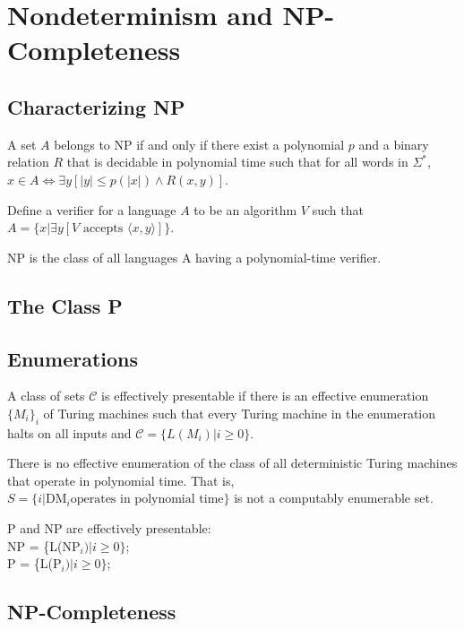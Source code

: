 \section{Nondeterminism and NP-Completeness}

\subsection{Characterizing NP}

 A set $A$ belongs to NP if and only if there exist a polynomial
$p$ and a binary relation $R$ that is decidable in polynomial time such that for all words
in $\Sigma^*$,
$x \in A \Leftrightarrow \exists y [|y| \le p(|x|) \land R(x, y)]$.

 Define a verifier for a language $A$ to be an algorithm $V$ such that
$A = \{x |\exists y[V \text{ accepts } \langle x, y \rangle ]\}$.

 NP is the class of all languages A having a polynomial-time
verifier.

\subsection{The Class P}

\subsection{Enumerations}

 A class of sets $\mathscr{C}$ is effectively presentable if there is an
effective enumeration $\{M_i\}_i$ of Turing machines such that every Turing machine in the
enumeration halts on all inputs and $\mathscr{C} = \{L(M_i) | i \ge 0\}$.

 There is no effective enumeration of the class of all
deterministic Turing machines that operate in polynomial time. That is,
$S = \{i | \text{DM}_i \text{operates in polynomial time}\}$
is not a computably enumerable set.

 P and NP are effectively presentable:\\
NP = \{L(NP$_i) | i \ge 0\}$;\\
P = \{L(P$_i) | i \ge 0\}$;

\subsection{NP-Completeness}


